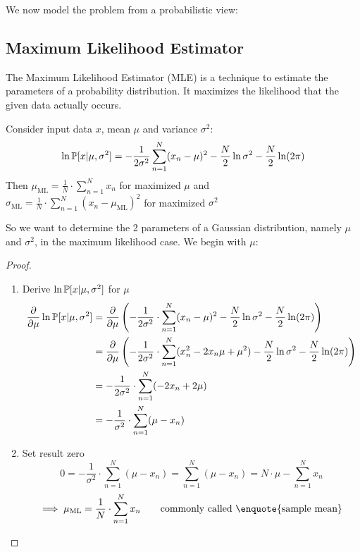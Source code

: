 
We now model the problem from a probabilistic view:

\subsection{Maximum Likelihood Estimator}
%
%
%
The Maximum Likelihood Estimator (MLE) is a technique to estimate the parameters of a probability distribution.
It maximizes the likelihood that the given data actually occurs.

\begin{theorem}
  Consider input data $x$, mean $\mu$ and variance $\sigma^2$:
  \[ \ln{\mathbb P[x | \mu, \sigma^2]} = -\frac1{2\sigma^2} \sum_{n=1}^N (x_n - \mu)^2 - \frac{N}{2} \ln{\sigma^2} - \frac{N}{2} \ln(2\pi) \]
  Then
  $\mu_{\text{ML}} = \frac{1}{N} \cdot \sum_{n=1}^N x_n$ for maximized $\mu$ and \\
    $\sigma_{\text{ML}} = \frac{1}{N}\cdot \sum_{n=1}^N (x_n - \mu_{\text{ML}})^2$ for maximized $\sigma^2$
\end{theorem}

So we want to determine the 2 parameters of a Gaussian distribution, namely $\mu$ and $\sigma^2$, in the maximum likelihood case.
We begin with $\mu$:

\begin{proof}
\begin{enumerate}
  \item Derive $\ln{\mathbb P[x| \mu, \sigma^2]}$ for $\mu$
    \begin{align*}
      \frac\partial{\partial \mu} \ln{\mathbb P[x | \mu, \sigma^2]}
      &= \frac\partial{\partial \mu} \left(-\frac{1}{2\sigma^2} \cdot \sum_{n=1}^N (x_n - \mu)^2 - \frac{N}{2} \ln{\sigma^2} - \frac{N}{2} \ln(2\pi)\right) \\
      &= \frac\partial{\partial \mu} \left(-\frac{1}{2\sigma^2} \cdot \sum_{n=1}^N (x_n^2 - 2 x_n \mu + \mu^2) - \frac{N}{2} \ln{\sigma^2} - \frac{N}{2} \ln(2\pi)\right) \\
      &= -\frac{1}{2\sigma^2} \cdot \sum_{n=1}^N (-2x_n + 2\mu) \\
      &= -\frac1{\sigma^2} \cdot \sum_{n=1}^N (\mu - x_n)
    \end{align*}
  \item Set result zero
    \[ 0 = -\frac{1}{\sigma^2} \cdot \sum_{n=1}^N (\mu - x_n) = \sum_{n=1}^N (\mu - x_n) = N \cdot \mu - \sum_{n=1}^N x_n \]
    \[ \implies \mu_{\text{ML}} = \frac1N \cdot \sum_{n=1}^N x_n \qquad \text{commonly called \enquote{sample mean}} \]
\end{enumerate}
\end{proof}

